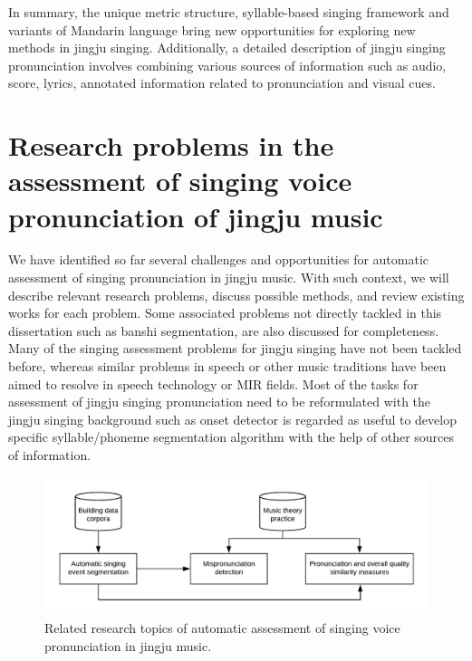 In summary, the unique metric structure, syllable-based singing framework and variants of Mandarin language bring new opportunities for exploring new methods in jingju singing. Additionally, a detailed description of jingju singing pronunciation involves combining various sources of information such as audio, score, lyrics, annotated information related to pronunciation and visual cues.

\section{Research problems in the assessment of singing voice pronunciation of jingju music}\label{sec:ch3:research_problems}

We have identified so far several challenges and opportunities for automatic assessment of singing pronunciation in jingju music. With such context, we will describe relevant research problems, discuss possible methods, and review existing works for each problem. Some associated problems not directly tackled in this dissertation such as banshi segmentation, are also discussed for completeness. Many of the singing assessment problems for jingju singing have not been tackled before, whereas similar problems in speech or other music traditions have been aimed to resolve in speech technology or MIR fields. Most of the tasks for assessment of jingju singing pronunciation need to be reformulated with the jingju singing background such as onset detector is regarded as useful to develop specific syllable/phoneme segmentation algorithm with the help of other sources of information.

\begin{figure}[ht!]
\includegraphics[width=\textwidth]{figs/blockDiags_rong/ch3_related_topics.png}
\caption{Related research topics of automatic assessment of singing voice pronunciation in jingju music.}
\label{fig:related_research_topics}
\end{figure}

